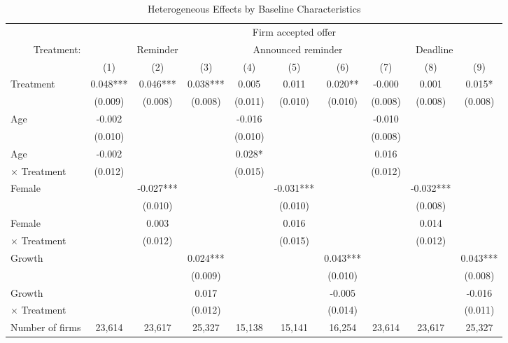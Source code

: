 \begin{table}[H] \centering
\caption{Heterogeneous Effects by Baseline Characteristics}
\label{tab:het_admin_data_main_antrem_rem_dl_ontime}
\begin{adjustbox}{max width=1.2\textwidth, center}
\begin{tabular}{lccccccccc}
\toprule
 & \multicolumn{9}{c}{Firm accepted offer} \\
\cmidrule(lr){2-10}
\multicolumn{1}{r}{Treatment:} & \multicolumn{3}{c}{Reminder} & \multicolumn{3}{c}{Announced reminder} & \multicolumn{3}{c}{Deadline} \\
\cmidrule(lr){2-4} \cmidrule(lr){5-7} \cmidrule(lr){8-10}
 & (1) & (2) & (3) & (4) & (5) & (6) & (7) & (8) & (9) \\
\midrule
Treatment & 0.048*** & 0.046*** & 0.038*** & 0.005 & 0.011 & 0.020** & -0.000 & 0.001 & 0.015* \\ & (0.009) & (0.008) & (0.008) & (0.011) & (0.010) & (0.010) & (0.008) & (0.008) & (0.008) \\
Age & -0.002 &  &  & -0.016 &  &  & -0.010 &  &  \\ & (0.010) &  &  & (0.010) &  &  & (0.008) &  \\
Age & -0.002 &  &  & 0.028* &  &  & 0.016 &  &   \\
\hspace{1em} $\times$ Treatment & (0.012) &  &  & (0.015) &  &  & (0.012) &   \\
Female &  & -0.027*** &  &  & -0.031*** &  &  & -0.032*** &  \\ &  & (0.010) &  &  & (0.010) &  &  & (0.008) \\
Female &  & 0.003 &  &  & 0.016 &  &  & 0.014 &   \\
\hspace{1em} $\times$ Treatment &  & (0.012) &  &  & (0.015) &  &  & (0.012)  \\
Growth &  &  & 0.024*** &  &  & 0.043*** &  &  & 0.043*** \\ &  &  & (0.009) &  &  & (0.010) &  &  & (0.008) \\
Growth &  &  & 0.017 &  &  & -0.005 &  &  & -0.016  \\
\hspace{1em} $\times$ Treatment &  &  & (0.012) &  &  & (0.014) &  &  & (0.011)  \\
\midrule
Number of firms & 23,614 & 23,617 & 25,327 & 15,138 & 15,141 & 16,254 & 23,614 & 23,617 & 25,327 \\
\bottomrule
\end{tabular}
\end{adjustbox}
\end{table}
